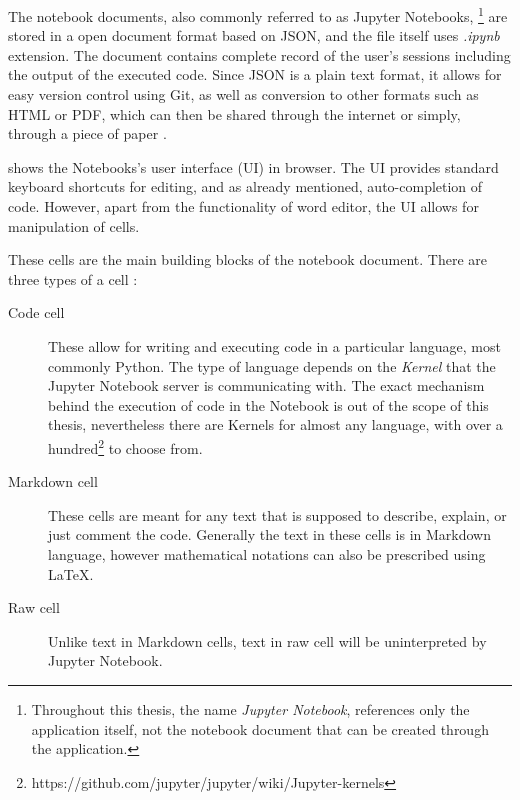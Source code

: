 \documentclass[
  digital,     %
  oneside,     %
  nosansbold,  %
  nocolorbold, %
  lof,         %
  lot,         %
]{fithesis4}
\begin{document}
The notebook documents, also commonly referred to as Jupyter Notebooks, 
\footnote{Throughout this thesis, the name \emph{Jupyter Notebook}, references only the application itself, not the notebook document that can be created through the application.}
are stored in a open document format based on JSON, and the file itself uses \emph{.ipynb} extension. The document contains complete record of the user's sessions including the output of the executed code. Since JSON is a plain text format, it allows for easy version control using Git, as well as conversion to other formats such as HTML or PDF, which can then be shared through the internet or simply, through a piece of paper \cite{jupyter_notebook}. 

 shows the Notebooks's user interface (UI) in browser. The UI provides standard keyboard shortcuts for editing, and as already mentioned, auto-completion of code. However, apart from the functionality of word editor, the UI allows for manipulation of cells.

These cells are the main building blocks of the notebook document. There are three types of a cell \cite{jupyter_notebook}:

\begin{description}

    \item[Code cell]
    These allow for writing and executing code in a particular language, most commonly Python. The type of language depends on the \emph{Kernel} that the Jupyter Notebook server is communicating with. The exact mechanism behind the execution of code in the Notebook is out of the scope of this thesis, nevertheless there are Kernels for almost any language, with over a hundred\footnote{https://github.com/jupyter/jupyter/wiki/Jupyter-kernels} to choose from.

    \item[Markdown cell]
    These cells are meant for any text that is supposed to describe, explain, or just comment the code. Generally the text in these cells is in Markdown language, however mathematical notations can also be prescribed using LaTeX. 
    
    \item[Raw cell]
    Unlike text in Markdown cells, text in raw cell will be uninterpreted by Jupyter Notebook.
    
\end{description}
\end{document}
